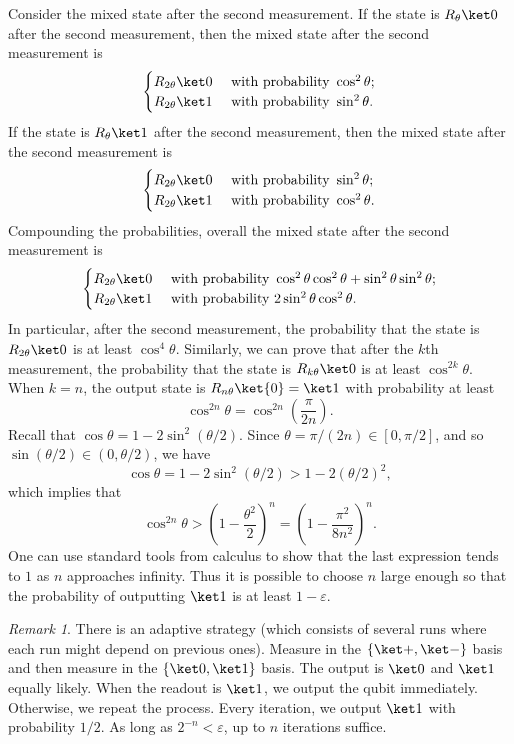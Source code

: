 \documentclass[12pt,answers]{exam}
\theoremstyle{remark}
\newtheorem*{remark}{Remark}
\newcommand{\eps}{\varepsilon}
\newcommand{\stdb}{\{\ket0,\ket1\}}
\newcommand{\pmbs}{\{\ket+,\ket-\}}
\begin{document}
Consider the mixed state after the second measurement. If the state is $R_{\theta}\ket0$ after the second measurement, then the mixed state after the second measurement is
$$
\begin{cases}
  R_{2\theta}\ket0 & \text{ with probability } \cos^2\theta;\\
  R_{2\theta}\ket1 & \text{ with probability } \sin^2\theta.
\end{cases}
$$
If the state is $R_{\theta}\ket1$ after the second measurement, then the mixed state after the second measurement is
$$
\begin{cases}
  R_{2\theta}\ket0 & \text{ with probability } \sin^2\theta;\\
  R_{2\theta}\ket1 & \text{ with probability } \cos^2\theta.
\end{cases}
$$
Compounding the probabilities, overall the mixed state after the second measurement is
$$
\begin{cases}
  R_{2\theta}\ket0 & \text{ with probability } \cos^2\theta\cos^2\theta + \sin^2\theta\sin^2\theta;\\
  R_{2\theta}\ket1 & \text{ with probability } 2\sin^2\theta\cos^2\theta.
\end{cases}
$$
In particular, after the second measurement, the probability that the state is $R_{2\theta}\ket0$ is at least $\cos^4\theta$. Similarly, we can prove that after the $k$th measurement, the probability that the state is $R_{k\theta}\ket0$ is at least $\cos^{2k}\theta$. When $k = n$, the output state is $R_{n\theta}\ket{0} = \ket1$ with probability at least
$$
  \cos^{2n}\theta = \cos^{2n}\left(\frac{\pi}{2n}\right).
$$
Recall that $\cos\theta = 1 - 2\sin^2(\theta/2)$. Since $\theta = \pi/(2n) \in [0, \pi/2]$, and so $\sin(\theta/2) \in (0,\theta/2)$, we have
$$
  \cos\theta = 1 - 2\sin^2(\theta/2) > 1 - 2(\theta/2)^2,
$$
which implies that
$$
  \cos^{2n}\theta > \left(1-\frac{\theta^2}{2}\right)^n = \left(1-\frac{\pi^2}{8n^2}\right)^n.
$$
One can use standard tools from calculus to show that the last expression tends to $1$ as $n$ approaches infinity. Thus it is possible to choose $n$ large enough so that the probability of outputting $\ket1$ is at least $1 - \eps$.

\begin{remark}
  There is an adaptive strategy (which consists of several runs where each run might depend on previous ones). Measure in the $\pmbs$ basis and then measure in the $\stdb$ basis. The output is $\ket0$ and $\ket1$ equally likely. When the readout is $\ket1$, we output the qubit immediately. Otherwise, we repeat the process. Every iteration, we output $\ket1$ with probability $1/2$. As long as $2^{-n} < \eps$, up to $n$ iterations suffice.
\end{remark}
\end{document}
